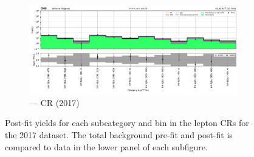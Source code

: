 \begin{figure}[htbp]
    \begin{subfigure}[b]{0.65\textwidth}
        \includegraphics[width=\textwidth]{chapters/higgstoinv/figures/mountain_ranges/2017/ttH/Zee_tree_fit_s-abs_values_ttH_cats.pdf}
        \caption{\ttH --- \doubleEleCr \gls{CR} (2017)}
    \end{subfigure}
    \caption[Post-fit yields for each \ttH subcategory and \ptmiss bin in the lepton control regions for the 2017 dataset]{Post-fit yields for each \ttH subcategory and \ptmiss bin in the lepton \glspl{CR} for the 2017 dataset. The total background pre-fit and post-fit is compared to data in the lower panel of each subfigure.}
    \label{fig:htoinv_mountain_range_ttH_2017_CRs}
\end{figure}

